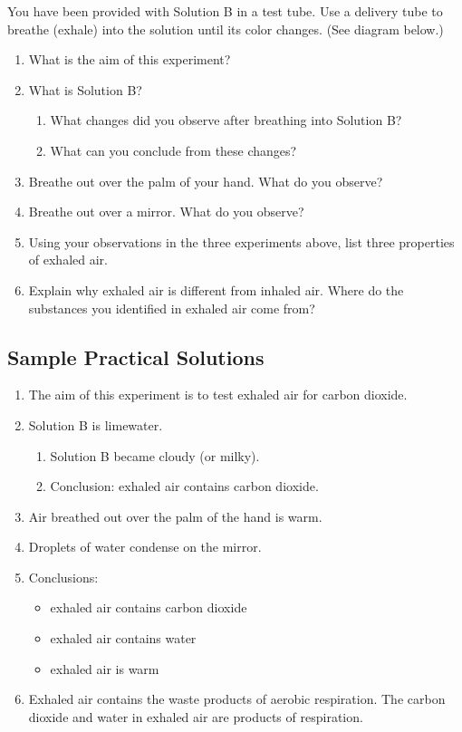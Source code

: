 You have been provided with Solution B in a test tube. Use a delivery tube to breathe (exhale) into the solution until its color changes. (See diagram below.) 

\begin{enumerate}
\item{What is the aim of this experiment?}
\item{What is Solution B?}
\begin{enumerate}
\item{What changes did you observe after breathing into Solution B?}	
\item{What can you conclude from these changes?}
\end{enumerate}
\item{Breathe out over the palm of your hand. What do you observe?}
\item{Breathe out over a mirror. What do you observe?}
\item{Using your observations in the three experiments above, list three properties of exhaled air.}
\item{Explain why exhaled air is different from inhaled air. Where do the substances you identified in exhaled air come from?}
\end{enumerate}

\subsection{Sample Practical Solutions}

\begin{enumerate}
\item{The aim of this experiment is to test exhaled air for carbon dioxide.}
\item{Solution B is limewater.}
\begin{enumerate}
\item{Solution B became cloudy (or milky).}
\item{Conclusion: exhaled air contains carbon dioxide.}
\end{enumerate}
\item{Air breathed out over the palm of the hand is warm.}
\item{Droplets of water condense on the mirror.}
\item{Conclusions:}
\begin{itemize}
\item{exhaled air contains carbon dioxide}
\item{exhaled air contains water}
\item{exhaled air is warm}
\end{itemize}
\item{Exhaled air contains the waste products of aerobic respiration. The carbon dioxide and water in exhaled air are products of respiration.}
\end{enumerate}

